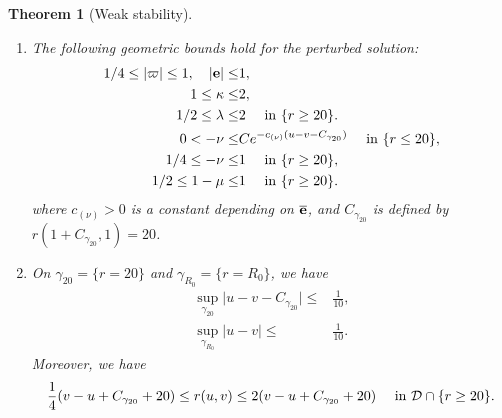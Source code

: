 \documentclass[10pt, reqno]{amsart}
\newtheorem{theorem}{Theorem}[section]
\theoremstyle{definition}
\theoremstyle{remark}
\theoremstyle{conjecture}
\numberwithin{equation}{section}
\newcommand{\abs}[1]{\vert#1\vert}
\newcommand{\set}[1]{\{#1\}}
\newcommand{\ud}{\mathrm{d}}
\newcommand{\rd}{\partial}
\newcommand{\0}{\emptyset}
\newcommand{\gmm}{\gamma}
\newcommand{\Gmm}{\Gamma}
\newcommand{\dlt}{\delta}
\newcommand{\eps}{\epsilon}
\newcommand{\kpp}{\kappa}
\newcommand{\lmb}{\lambda}
\newcommand{\Lmb}{\Lambda}
\newcommand{\omg}{\omega}
\newcommand{\bfe}{{\bf e}}
\newcommand{\calD}{\mathcal D}
\newcommand{\dur}{\nu}
\newcommand{\dvr}{\lmb}
\newcommand{\e}{\bfe}							%
\newcommand{\phibg}{\overline{\phi}}				%
\newcommand{\ebg}{\overline{\e}}					%
\begin{document}
\begin{theorem} [Weak stability]
\begin{enumerate}
\begin{equation}
\begin{aligned}
	& \leq  C \left( \int_{\Gmm^{(in)}_{\tau_{1}}} \frac{1}{(-\dur)} (\rd_{u} (\phi - \phibg))^{2} r^{2} \, \ud u
	+ \int_{\Gmm^{(out)}_{\tau_{1}}} \kpp^{-1} (\rd_{v} (\phi - \phibg))^{2} r^{2} \, \ud v \right) 
		+ C (\log^{2} \Lmb) \tau_{1}^{-2 \omg+1+\eta_{0}} \dlt^{2} \eps^{2}.
\end{aligned}
\end{equation}
Furthermore, $\rd_{v} (\phi - \phibg)$ enjoys an improved integrated decay estimate:
\begin{equation} \label{eq:energy-dvphi}
\iint_{\calD(1, \infty) \cap \set{r \geq 20}} \frac{1}{r} \dvr^{-1} (\rd_{v} (\phi - \phibg))^{2} r^{2} \, \ud u \ud v
\leq C \eps^{2},
\end{equation}
and the difference $\phi - \phibg$ obeys the following pointwise estimate:
\begin{equation} \label{eq:energy-phidf-pt}
	\sup_{\calD(1, \infty)} r \abs{\phi - \phibg}^{2} \leq C \eps^{2}.
\end{equation}


\item The following geometric bounds hold for the perturbed solution:
\begin{align} 
	1/4 \leq \abs{\varpi} \leq 1, \quad \abs{\e} \leq & 1, \label{eq:weak-st:me-bnd} \\
	1 \leq \kpp \leq & 2, \label{eq:weak-st:kpp-bnd} \\
	1/2 \leq \dvr \leq & 2 \quad \hbox{ in } \set{r \geq 20}. \label{eq:weak-st:dvr-large-r} \\
	0 < -\dur \leq & C e^{-c_{(\dur)} (u - v - C_{\gmm_{20}})} \quad \hbox{ in } \set{r \leq 20}, \label{eq:weak-st:dur-small-r} \\
	1/4 \leq -\dur \leq & 1 \quad \hbox{ in } \set{r \geq 20}, \label{eq:weak-st:dur-large-r} \\
	1/2 \leq 1-\mu \leq & 1 \quad \hbox{ in } \set{r \geq 20}. \label{eq:weak-st:mu-large-r} 
\end{align}
where $c_{(\dur)} > 0$ is a constant depending on $\ebg$, and $C_{\gmm_{20}}$ is defined by $r(1+C_{\gmm_{20}}, 1) = 20$. 

\item
On $\gmm_{20} = \set{r = 20}$ and $\gmm_{R_{0}} = \set{r = R_{0}}$, we have
\begin{align} 
	\sup_{\gmm_{20}} \abs{u - v - C_{\gmm_{20}}} \leq  & \frac{1}{10}, \label{eq:weak-st:v-u}  \\
	\sup_{\gmm_{R_{0}}} \abs{u - v} \leq & \frac{1}{10}. \label{eq:weak-st:v-u-R0} 
\end{align}
Moreover, we have
\begin{equation} \label{eq:weak-st:v-u-r}
	\frac{1}{4} (v - u + C_{\gmm_{20}} + 20) \leq r(u, v) \leq 2 (v - u + C_{\gmm_{20}} + 20) \quad \hbox{ in } \calD \cap \set{r \geq 20}.
\end{equation}



\end{enumerate}
\end{theorem}
\end{document}
